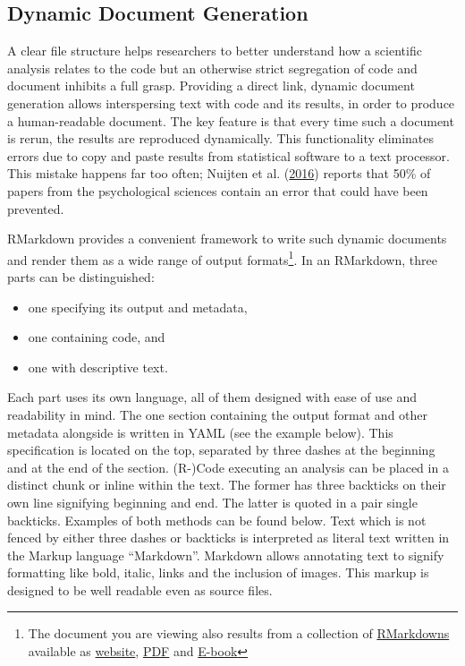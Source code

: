 \documentclass[12pt,a4paper,]{article}
\providecommand{\tightlist}{%
  \setlength{\itemsep}{0pt}\setlength{\parskip}{0pt}}
\begin{document}
\hypertarget{dynamic-document-generation}{%
\subsection{Dynamic Document Generation}\label{dynamic-document-generation}}

A clear file structure helps researchers to better understand how a scientific analysis relates to the code but an otherwise strict segregation of code and document inhibits a full grasp.
Providing a direct link, dynamic document generation allows interspersing text with code and its results, in order to produce a human-readable document.
The key feature is that every time such a document is rerun, the results are reproduced dynamically.
This functionality eliminates errors due to copy and paste results from statistical software to a text processor. This mistake happens far too often; Nuijten et al. (\protect\hyperlink{ref-nuijtenPrevalenceStatisticalReporting2016}{2016}) reports that 50\% of papers from the psychological sciences contain an error that could have been prevented.

RMarkdown provides a convenient framework to write such dynamic documents and render them as a wide range of output formats\footnote{The document you are viewing also results from a collection of \href{https://github.com/aaronpeikert/repro-thesis}{RMarkdowns} available as \href{https://aaronpeikert.github.io/repro-thesis/}{website}, \href{https://aaronpeikert.github.io/repro-thesis/ma.pdf}{PDF} and \href{https://aaronpeikert.github.io/repro-thesis/ma.epub}{E-book}}. In an RMarkdown, three parts can be distinguished:

\begin{itemize}
\tightlist
\item
  one specifying its output and metadata,
\item
  one containing code, and
\item
  one with descriptive text.
\end{itemize}

Each part uses its own language, all of them designed with ease of use and readability in mind.
The one section containing the output format and other metadata alongside is written in YAML (see the example below).
This specification is located on the top, separated by three dashes at the beginning and at the end of the section.
(R-)Code executing an analysis can be placed in a distinct chunk or inline within the text.
The former has three backticks on their own line signifying beginning and end.
The latter is quoted in a pair single backticks.
Examples of both methods can be found below.
Text which is not fenced by either three dashes or backticks is interpreted as literal text written in the Markup language ``Markdown''.
Markdown allows annotating text to signify formatting like bold, italic, links and the inclusion of images.
This markup is designed to be well readable even as source files.
\end{document}
